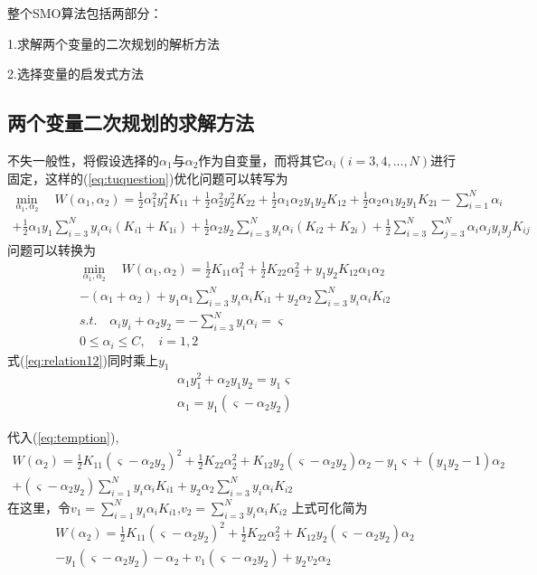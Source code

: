\documentclass{article}
\begin{document}
整个SMO算法包括两部分：

1.{\color{red}求解两个变量的二次规划的解析方法}

2.{\color{red}选择变量的启发式方法}

\subsection{两个变量二次规划的求解方法}
不失一般性，将假设选择的$\alpha_1$与$\alpha_2$作为自变量，而将其它$\alpha_i(i=3,4,...,N)$进行固定，这样的(\ref{eq:tuquestion})优化问题可以转写为
\begin{gather}
    \min\limits_{\alpha_1,\alpha_2}\quad W(\alpha_1,\alpha_2)=\frac{1}{2}\alpha_1^2 y_1^2 K_{11}+\frac{1}{2}\alpha_2^2 y_2^2 K_{22}+\frac{1}{2}\alpha_1 \alpha_2 y_1 y_2 K_{12}+\frac{1}{2} \alpha_2 \alpha_1 y_2 y_1 K_{21}-\sum_{i=1}^{N}\alpha_i \\+\frac{1}{2}\alpha_1 y_1 \sum_{i=3}^{N} y_i \alpha_i (K_{i1}+K_{1i})+\frac{1}{2} \alpha_2 y_2 \sum_{i=3}^{N} y_i \alpha_i (K_{i2}+K_{2i})+\frac{1}{2}\sum_{i=3}^{N}\sum_{j=3}^{N}\alpha_i \alpha_j y_i y_j K_{ij} 
\end{gather}
问题可以转换为
\begin{gather}
    \min\limits_{\alpha_1,\alpha_2}\quad W(\alpha_1,\alpha_2)=\frac{1}{2}K_{11}\alpha_1^2+\frac{1}{2}K_{22}\alpha_2^2+y_1 y_2 K_{12} \alpha_1 \alpha_2 \nonumber\\
    -(\alpha_1+\alpha_2) +y_1 \alpha_1\sum_{i=3}^{N} y_i \alpha_i K_{i1} +y_2 \alpha_2 \sum_{i=3}^{N}y_i \alpha_i K_{i2}  \label{eq:temption}\\
    s.t.\quad \alpha_i y_i+\alpha_2 y_2=-\sum_{i=3}^{N}y_i \alpha_i=\varsigma   \label{eq:relation12}\\
    0\le \alpha_i \le C,\quad i=1,2
\end{gather}
式(\ref{eq:relation12})同时乘上$y_1$
\begin{gather}
    \alpha_1 y_1^2+\alpha_2 y_1 y_2=y_1 \varsigma\\
    \alpha_1=y_1(\varsigma-\alpha_2 y_2)
\end{gather}

代入(\ref{eq:temption}),
\begin{gather}
    W(\alpha_2)=\frac{1}{2} K_{11}(\varsigma-\alpha_2 y_2)^2 +\frac{1}{2}K_{22}\alpha_2^2+K_{12} y_2 (\varsigma-\alpha_2 y_2)\alpha_2-y_1 \varsigma+(y_1 y_2-1) \alpha_2 \nonumber\\
    +(\varsigma-\alpha_2 y_2) \sum_{i=1}^{N}y_i \alpha_i K_{i1}+y_2 \alpha_2 \sum_{i=3}^{N}y_i \alpha_i K_{i2}
\end{gather}
在这里，令$v_1=\sum_{i=1}^{N}y_i \alpha_i K_{i1}$,$v_2=\sum_{i=3}^{N}y_i \alpha_i K_{i2}$
上式可化简为
\begin{gather}
    W(\alpha_2)=\frac{1}{2} K_{11}(\varsigma-\alpha_2 y_2)^2 +\frac{1}{2}K_{22}\alpha_2^2+K_{12} y_2 (\varsigma-\alpha_2 y_2)\alpha_2 \nonumber\\
    -y_1 (\varsigma-\alpha_2 y_2)- \alpha_2+v_1(\varsigma-\alpha_2 y_2)+y_2 v_2 \alpha_2 
\end{gather}
\end{document}
